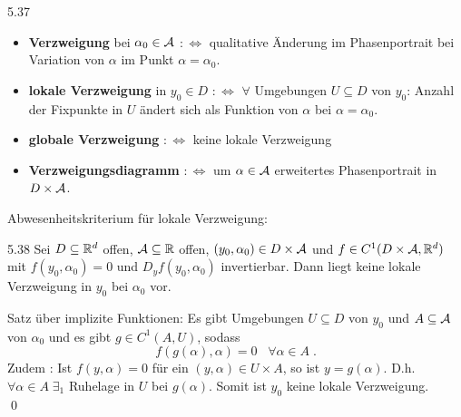 \documentclass[a4paper]{article}
\begin{document}
\begin{Def}{}{5.37}
\begin{itemize}
\item \textbf{Verzweigung} bei $\alpha_0\in\operatorname{\mathcal{A}}$ $:\iff$ qualitative Änderung im Phasenportrait bei Variation von $\alpha$ im Punkt $\alpha=\alpha_0$.
\item \textbf{lokale Verzweigung} in $y_0\in D$ $:\iff$ $\forall$ Umgebungen $U\subseteq D$ von $y_0$: Anzahl der Fixpunkte in $U$ ändert sich als Funktion von $\alpha$ bei $\alpha=\alpha_0$.
\item \textbf{globale Verzweigung} $:\iff$ keine lokale Verzweigung
\item \textbf{Verzweigungsdiagramm} $:\iff$ um $\alpha\in\operatorname{\mathcal{A}}$ erweitertes Phasenportrait in $D\times\operatorname{\mathcal{A}}$.
\end{itemize}
\end{Def}

Abwesenheitskriterium für lokale Verzweigung:

\begin{Satz}{}{5.38}
Sei $D\subseteq \mathbb R^d$ offen, $\operatorname{\mathcal{A}}\subseteq \mathbb R$ offen, $(y_0,\alpha_0)\in D\times \operatorname{\mathcal{A}}$ und $f\in C^1(D\times\operatorname{\mathcal{A}},\mathbb R^d)$ mit $f(y_0,\alpha_0)=0$ und $D_yf(y_0,\alpha_0)$ invertierbar. Dann liegt keine lokale Verzweigung in $y_0$ bei $\alpha_0$ vor.
\end{Satz}

\begin{Beweis}
Satz über implizite Funktionen: Es gibt Umgebungen $U\subseteq D$ von $y_0$ und $A\subseteq \operatorname{\mathcal{A}}$ von $\alpha_0$ und es gibt $g\in C^1(A,U)$, sodass
\[f(g(\alpha),\alpha)=0\;\;\;\forall\alpha\in A\;.\]
Zudem : Ist $f(y,\alpha)=0$ für ein $(y,\alpha)\in U\times A$, so ist $y=g(\alpha)$. D.h. $\forall \alpha\in A\;\exists_1$ Ruhelage in $U$ bei $g(\alpha)$. Somit ist $y_0$ keine lokale Verzweigung.\\\qed
\end{Beweis}
\end{document}

